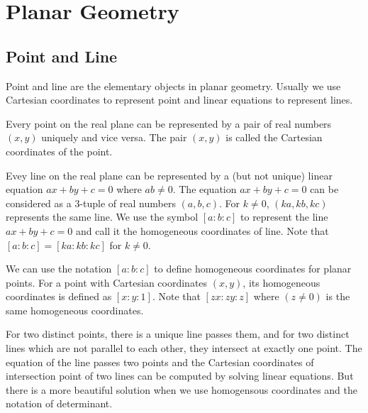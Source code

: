 \def\det22#1#2#3#4{\left|\begin{matrix}#1 & #2\cr #3 & #4\end{matrix}\right|}

\section{Planar Geometry}

\subsection{Point and Line}
Point and line are the elementary objects in planar geometry.
Usually we use Cartesian coordinates to represent point and linear equations to
represent lines.

Every point on the real plane can be represented by a pair of real numbers
$(x, y)$ uniquely and vice versa. The pair $(x, y)$ is called the Cartesian
coordinates of the point.

Evey line on the real plane can be represented by a (but not unique) linear
equation $ax + by + c = 0$ where $ab \neq 0$. The equation $ax + by + c = 0$ can
be considered as a $3$-tuple of real numbers $(a, b, c)$. For $k \neq 0$,
$(ka, kb, kc)$ represents the same line. We use the symbol $[a : b : c]$ to
represent the line $ax + by + c = 0$ and call it the homogeneous coordinates of
line. Note that $[a : b : c] = [ka : kb : kc]$ for $k \neq 0$.

We can use the notation $[a : b : c]$ to define homogeneous coordinates for
planar points. For a point with Cartesian coordinates $(x, y)$, its homogeneous
coordinates is defined as $[x : y : 1]$. Note that $[zx : zy : z]$ where
$(z \neq 0)$ is the same homogeneous coordinates.

For two distinct points, there is a unique line passes them, and for two distinct
lines which are not parallel to each other, they intersect at exactly one point.
The equation of the line passes two points and the Cartesian
coordinates of intersection point of two lines can be computed by solving linear
equations. But there is a more beautiful solution when we use homogensous
coordinates and the notation of determinant.

